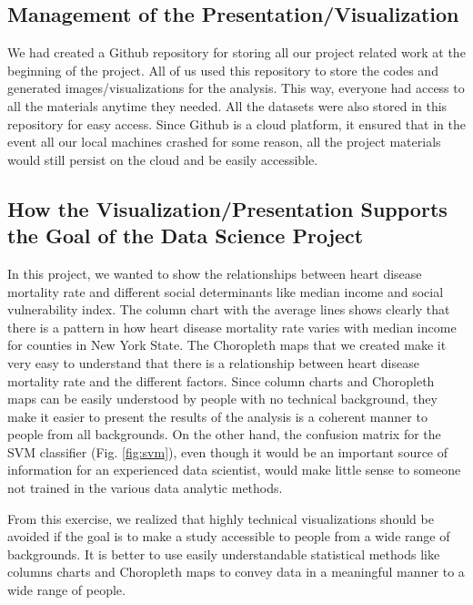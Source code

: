 \documentclass[journal,12pt,onecolumn]{IEEEtran}
\begin{document}
\subsection{Management of the Presentation/Visualization}
We had created a Github repository for storing all our project related work at the beginning of the project.
All of us used this repository to store the codes and generated images/visualizations for the analysis.
This way, everyone had access to all the materials anytime they needed.
All the datasets were also stored in this repository for easy access.
Since Github is a cloud platform, it ensured that in the event all our local machines crashed for some reason, all the project materials would still persist on the cloud and be easily accessible.

\subsection{How the Visualization/Presentation Supports the Goal of the Data Science Project}
In this project, we wanted to show the relationships between heart disease mortality rate and different social determinants like median income and social vulnerability index.
The column chart with the average lines shows clearly that there is a pattern in how heart disease mortality rate varies with  median income for counties in New York State.
The Choropleth maps that we created make it very easy to understand that there is a relationship between heart disease mortality rate and the different factors.
Since column charts and Choropleth maps can be easily understood by people with no technical background, they make it easier to present the results of the analysis is a coherent manner to people from all backgrounds.
On the other hand, the confusion matrix for the SVM classifier (Fig. \ref{fig:svm}), even though it would be an important source of information for an experienced data scientist, would make little sense to someone not trained in the various data analytic methods.

From this exercise, we realized that highly technical visualizations should be avoided if the goal is to make a study accessible to people from a wide range of backgrounds.
It is better to use easily understandable statistical methods like columns charts and Choropleth maps to convey data in a meaningful manner to a wide range of people.
\end{document}
